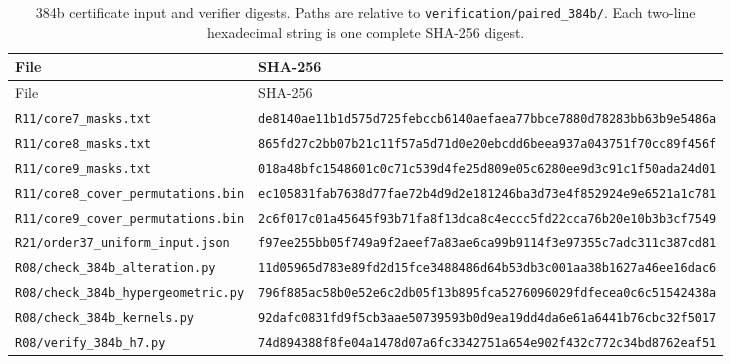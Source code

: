 \documentclass[11pt,a4paper]{article}
\theoremstyle{definition}\newtheorem{definition}[theorem]{Definition}
\theoremstyle{remark}\newtheorem{remark}[theorem]{Remark}
\begin{document}
\begingroup\footnotesize
\setlength{\tabcolsep}{4pt}
\begin{longtable}{p{}p{}}
\caption{384b certificate input and verifier digests. Paths are relative to
\nolinkurl{verification/paired_384b/}. Each two-line hexadecimal string
is one complete SHA-256 digest.}\label{paired:hash-table}\\
\toprule
File & SHA-256\\\midrule\endfirsthead
\toprule File & SHA-256\\\midrule\endhead
\bottomrule\endfoot
\nolinkurl{R11/core7_masks.txt} & \texttt{de8140ae11b1d575d725febccb6140ae}\newline\texttt{faea77bbce7880d78283bb63b9e5486a}\\[3pt]
\nolinkurl{R11/core8_masks.txt} & \texttt{865fd27c2bb07b21c11f57a5d71d0e20}\newline\texttt{ebcdd6beea937a043751f70cc89f456f}\\[3pt]
\nolinkurl{R11/core9_masks.txt} & \texttt{018a48bfc1548601c0c71c539d4fe25d}\newline\texttt{809e05c6280ee9d3c91c1f50ada24d01}\\[3pt]
\nolinkurl{R11/core8_cover_permutations.bin} & \texttt{ec105831fab7638d77fae72b4d9d2e18}\newline\texttt{1246ba3d73e4f852924e9e6521a1c781}\\[3pt]
\nolinkurl{R11/core9_cover_permutations.bin} & \texttt{2c6f017c01a45645f93b71fa8f13dca8}\newline\texttt{c4eccc5fd22cca76b20e10b3b3cf7549}\\[3pt]
\nolinkurl{R21/order37_uniform_input.json} & \texttt{f97ee255bb05f749a9f2aeef7a83ae6c}\newline\texttt{a99b9114f3e97355c7adc311c387cd81}\\[3pt]
\nolinkurl{R08/check_384b_alteration.py} & \texttt{11d05965d783e89fd2d15fce3488486d}\newline\texttt{64b53db3c001aa38b1627a46ee16dac6}\\[3pt]
\nolinkurl{R08/check_384b_hypergeometric.py} & \texttt{796f885ac58b0e52e6c2db05f13b895f}\newline\texttt{ca5276096029fdfecea0c6c51542438a}\\[3pt]
\nolinkurl{R08/check_384b_kernels.py} & \texttt{92dafc0831fd9f5cb3aae50739593b0d}\newline\texttt{9ea19dd4da6e61a6441b76cbc32f5017}\\[3pt]
\nolinkurl{R08/verify_384b_h7.py} & \texttt{74d894388f8fe04a1478d07a6fc33427}\newline\texttt{51a654e902f432c772c34bd8762eaf51}\\[3pt]

\end{longtable}
\end{document}
